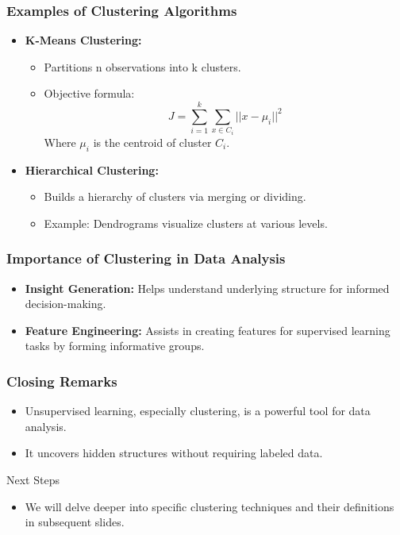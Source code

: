 \documentclass[aspectratio=169]{beamer}
\begin{document}
\begin{frame}[fragile]
    \frametitle{Examples of Clustering Algorithms}
    \begin{itemize}
        \item \textbf{K-Means Clustering:} 
            \begin{itemize}
                \item Partitions n observations into k clusters.
                \item Objective formula:
                \begin{equation}
                    J = \sum_{i=1}^k \sum_{x \in C_i} || x - \mu_i ||^2
                \end{equation}
                Where \( \mu_i \) is the centroid of cluster \( C_i \).
            \end{itemize}
        
        \item \textbf{Hierarchical Clustering:}
            \begin{itemize}
                \item Builds a hierarchy of clusters via merging or dividing.
                \item Example: Dendrograms visualize clusters at various levels.
            \end{itemize}
    \end{itemize}
\end{frame}

\begin{frame}[fragile]
    \frametitle{Importance of Clustering in Data Analysis}
    \begin{itemize}
        \item \textbf{Insight Generation:} Helps understand underlying structure for informed decision-making.
        \item \textbf{Feature Engineering:} Assists in creating features for supervised learning tasks by forming informative groups.
    \end{itemize}
\end{frame}

\begin{frame}[fragile]
    \frametitle{Closing Remarks}
    \begin{itemize}
        \item Unsupervised learning, especially clustering, is a powerful tool for data analysis.
        \item It uncovers hidden structures without requiring labeled data.
    \end{itemize}
    \begin{block}{Next Steps}
        \begin{itemize}
            \item We will delve deeper into specific clustering techniques and their definitions in subsequent slides.
        \end{itemize}
    \end{block}
\end{frame}
\end{document}
